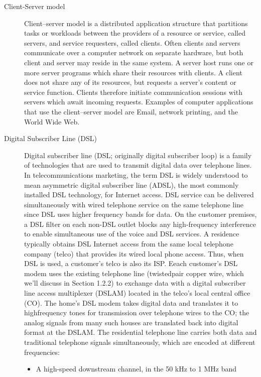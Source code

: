 \documentclass{article}
\begin{document}
\begin{description}
    \item[Client-Server model] Client–server model is a distributed application structure that partitions tasks or workloads between the providers of a resource or service, called servers, and service requesters, called clients. Often clients and servers communicate over a computer network on separate hardware, but both client and server may reside in the same system. A server host runs one or more server programs which share their resources with clients. A client does not share any of its resources, but requests a server's content or service function. Clients therefore initiate communication sessions with servers which await incoming requests. Examples of computer applications that use the client–server model are Email, network printing, and the World Wide Web.
    
    \item[Digital Subscriber Line (DSL)] Digital subscriber line (DSL; originally digital subscriber loop) is a family of technologies that are used to transmit digital data over telephone lines. In telecommunications marketing, the term DSL is widely understood to mean asymmetric digital subscriber line (ADSL), the most commonly installed DSL technology, for Internet access. DSL service can be delivered simultaneously with wired telephone service on the same telephone line since DSL uses higher frequency bands for data. On the customer premises, a DSL filter on each non-DSL outlet blocks any high-frequency interference to enable simultaneous use of the voice and DSL services. A residence typically obtains DSL Internet access
    from the same local telephone company (telco) that provides its wired local phone
    access. Thus, when DSL is used, a customer’s telco is also its ISP. Eeach customer’s DSL modem uses the existing telephone line (twistedpair copper wire, which we’ll discuss in Section 1.2.2) to exchange data with a digital
    subscriber line access multiplexer (DSLAM) located in the telco’s local central
    office (CO). The home’s DSL modem takes digital data and translates it to highfrequency
    tones for transmission over telephone wires to the CO; the analog signals
    from many such houses are translated back into digital format at the DSLAM.
    The residential telephone line carries both data and traditional telephone signals
    simultaneously, which are encoded at different frequencies:
    \begin{itemize}
        \item A high-speed downstream channel, in the 50 kHz to 1 MHz band

\end{itemize}
\end{description}
\end{document}
